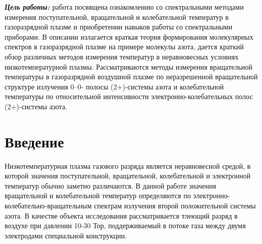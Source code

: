 \begin{center}
\end{center}

\textbf{\emph{Цель работы:}} работа посвящена ознакомлению со спектральными методами измерения поступательной, вращательной и колебательной температур в газоразрядной плазме и приобретении навыков работы со
спектральными приборами. В описании излагается краткая теория формирования молекулярных спектров
в газоразрядной плазме на примере молекулы азота, дается краткий обзор различных методов измерения
температур в неравновесных условиях низкотемпературной плазмы. Рассматриваются методы измерения
вращательной температуры в газоразрядной воздушной плазме по неразрешенной вращательной структуре
излучения 0–0- полосы (2+)-системы азота и колебательной температуры по относительной интенсивности
электронно-колебательных полос (2+)-системы азота.
\section{Введение}
Низкотемпературная плазма газового разряда является неравновесной средой, в
которой значения поступательной, вращательной, колебательной и электронной
температур обычно заметно различаются. В данной работе значения вращательной и
колебательной температур определяются по электронно-колебательно-вращательным
спектрам излучения второй положительной системы азота. В качестве объекта
исследования рассматривается тлеющий разряд в воздухе при давлении 10-30 Тор,
поддерживаемый в потоке газа между двумя электродами специальной конструкции.
